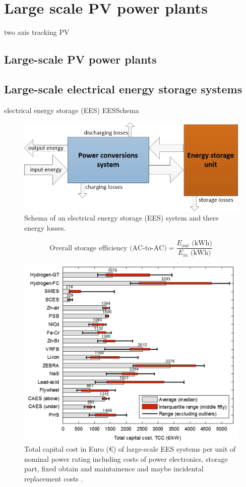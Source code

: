 \documentclass[Master,MEE,english]{twbook}%
\begin{document}
\section{Large scale PV power plants}\label{Large scale photo voltaic (PV) power plants}
two axis tracking PV
\subsection{Large-scale PV power plants}

\subsection{Large-scale electrical energy storage systems}
electrical energy storage (EES)
EESSchema
\begin{figure}[htbp]  
\centering
\includegraphics[width=0.65\linewidth]{FIG/EESSchema}
\caption[Schema of an electrical energy storage (EES) system and there energy losses.]{Schema of an electrical energy storage (EES) system and there energy losses.}\label{TCC_EES}
\end{figure}

\begin{equation}
\textrm{Overall storage efficiency (AC-to-AC)} =\frac{E_{out} \textrm{ (kWh)} }{E_{in} \textrm{ (kWh)}}
\end{equation}

\begin{figure}[htbp]  
\centering
\includegraphics[width=0.75\linewidth]{FIG/TCC_EES}
\caption[Total capital cost in Euro (€) of large-scale EES systems per unit of nominal power rating including costs of power electronics, storage part, fixed obtain and maintainence and maybe incidental replacement costs.]{Total capital cost in Euro (€) of large-scale EES systems per unit of nominal power rating including costs of power electronics, storage part, fixed obtain and maintainence and maybe incidental replacement costs \cite{Zakeri2015}.}\label{TCC_EES}
\end{figure}
\end{document}
